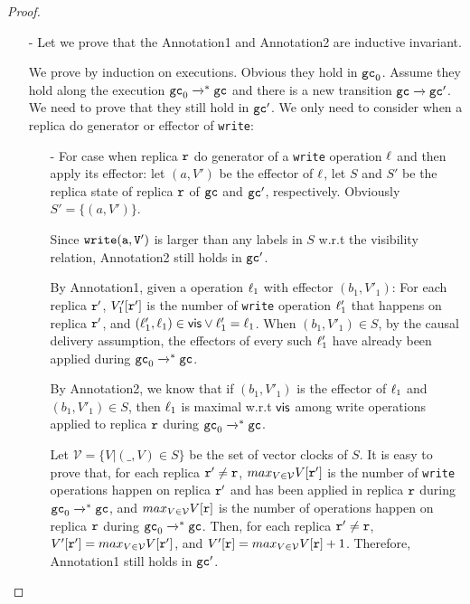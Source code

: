 \begin {proof}
\begin{itemize}
\item[-] Let we prove that the Annotation1 and Annotation2 are inductive invariant.

We prove by induction on executions. Obvious they hold in $\mathtt{gc}_0$. Assume they hold along the execution $\mathtt{gc}_0 \xrightarrow{}^* \mathtt{gc}$ and there is a new transition $\mathtt{gc} \xrightarrow{} \mathtt{gc}'$. We need to prove that they still hold in $\mathtt{gc}'$. We only need to consider when a replica do generator or effector of {\tt write}:

    \begin{itemize}
    \setlength{\itemsep}{0.5pt}
    \item[-] For case when replica $\mathtt{r}$ do generator of a {\tt write} operation $\ell$ and then apply its effector: let $(a,V')$ be the effector of $\ell$, let $S$ and $S'$ be the replica state of replica $\mathtt{r}$ of $\mathtt{gc}$ and $\mathtt{gc}'$, respectively. Obviously $S' = \{ (a,V') \}$.

        Since $\alabelshort[{\tt write}]{a,V'}$ is larger than any labels in $S$ w.r.t the visibility relation, Annotation2 still holds in $\mathtt{gc}'$.

        By Annotation1, given a operation $\ell_1$ with effector $(b_1,V'_1)$: For each replica $\mathtt{r}'$, $V'_1[\mathtt{r}']$ is the number of {\tt write} operation $\ell'_1$ that happens on replica $\mathtt{r}'$, and $(\ell'_1,\ell_1) \in \mathsf{vis} \vee \ell'_1 = \ell_1$. When $(b_1,V'_1) \in S$, by the causal delivery assumption, the effectors of every such $\ell'_1$ have already been applied during $\mathtt{gc}_0 \xrightarrow{}^* \mathtt{gc}$.

        By Annotation2, we know that if $(b_1,V'_1)$ is the effector of $\ell_1$ and $(b_1,V'_1) \in S$, then $\ell_1$ is maximal w.r.t $\mathsf{vis}$ among write operations applied to replica $\mathtt{r}$ during $\mathtt{gc}_0 \xrightarrow{}^* \mathtt{gc}$.

        Let $\mathcal{V} = \{ V \vert (\_,V) \in S \}$ be the set of vector clocks of $S$. It is easy to prove that, for each replica $\mathtt{r}' \neq \mathtt{r}$, $max_{V \in \mathcal{V}} V[\mathtt{r}']$ is the number of {\tt write} operations happen on replica $\mathtt{r}'$ and has been applied in replica $\mathtt{r}$ during $\mathtt{gc}_0 \xrightarrow{}^* \mathtt{gc}$, and $max_{V \in \mathcal{V}} V[\mathtt{r}]$ is the number of operations happen on replica $\mathtt{r}$ during $\mathtt{gc}_0 \xrightarrow{}^* \mathtt{gc}$. Then, for each replica $\mathtt{r}' \neq \mathtt{r}$, $V'[\mathtt{r}'] = max_{V \in \mathcal{V}} V[\mathtt{r}']$, and $V'[\mathtt{r}] = max_{V \in \mathcal{V}} V[\mathtt{r}] +1$. Therefore, Annotation1 still holds in $\mathtt{gc}'$.


\end{itemize}
\end{itemize}
\end{proof}
